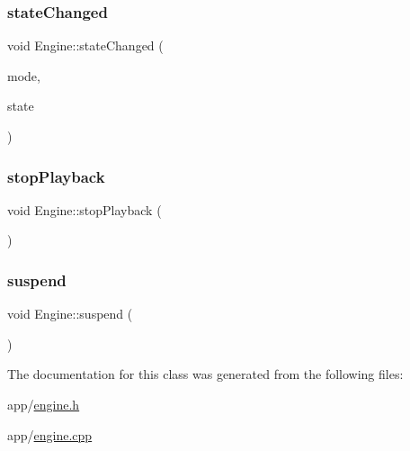 \hypertarget{class_engine_abd773c71dbe9b8433062dda03b40dc2e}{}\label{class_engine_abd773c71dbe9b8433062dda03b40dc2e} 
\subsubsection{\texorpdfstring{state\+Changed}{stateChanged}}
{\footnotesize\ttfamily void Engine\+::state\+Changed (\begin{DoxyParamCaption}\item[{Q\+Audio\+::\+Mode}]{mode,  }\item[{Q\+Audio\+::\+State}]{state }\end{DoxyParamCaption})\hspace{0.3cm}{\ttfamily [signal]}}

\hypertarget{class_engine_a382efef270e3ebe98e1b26945d080fa9}{}\label{class_engine_a382efef270e3ebe98e1b26945d080fa9} 
\subsubsection{\texorpdfstring{stop\+Playback}{stopPlayback}}
{\footnotesize\ttfamily void Engine\+::stop\+Playback (\begin{DoxyParamCaption}{ }\end{DoxyParamCaption})\hspace{0.3cm}{\ttfamily [slot]}}

\hypertarget{class_engine_a5a6a21b73b9571b41d45eadec6a86edd}{}\label{class_engine_a5a6a21b73b9571b41d45eadec6a86edd} 
\subsubsection{\texorpdfstring{suspend}{suspend}}
{\footnotesize\ttfamily void Engine\+::suspend (\begin{DoxyParamCaption}{ }\end{DoxyParamCaption})\hspace{0.3cm}{\ttfamily [slot]}}



The documentation for this class was generated from the following files\+:\begin{DoxyCompactItemize}
\item 
app/\hyperlink{engine_8h}{engine.\+h}\item 
app/\hyperlink{engine_8cpp}{engine.\+cpp}\end{DoxyCompactItemize}
